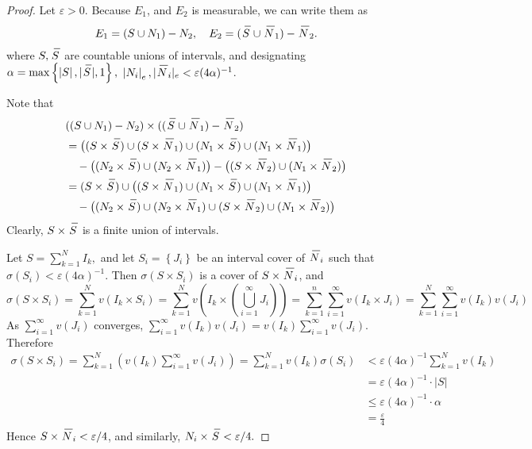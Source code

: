 \documentclass[12pt]{book}
\newcommand{\set}[1]{\left\{ #1 \right\}}
\renewcommand{\u}{\cup}
\newcommand{\bu}{\bigcup}
\newcommand{\inv}{^{-1}}
\newcommand{\cross}{\times}
\renewcommand{\.}{\mkern1mu}
\newcommand{\e}{\varepsilon}
\newcommand{\abs}[1]{\left| #1 \right|}
\newcommand{\lr}[1]{\left(#1\right)}
\newenvironment{pf}{\begin{proof}\setlength{\parindent}{\normalparindent}\setlength{\parskip}{\normalparskip}}{\end{proof}}
\theoremstyle{theorem}
\renewcommand{\bar}[1]{\overset{\hspace{3pt}\rule[0.5pt]{\widthof{#1}}  
	{0.1ex}}{#1}}
\newcommand{\mes}[1]{\abs{#1}}
\newcommand{\omes}[1]{\mes{#1}_e}
\newlength{\normalparindent}
\newlength{\normalparskip}
\begin{document}
	\begin{pf}
	Let $\e>0$. Because $E_1$, and $E_2$ is measurable, we can write them as
		\[ E_1 = (S \u N_1) - N_2, \quad E_2 = (\bar{S}\u \bar{N}_1) - \bar{N}_2.\]
	where $S,\bar{S}$ are countable unions of intervals, and designating $\alpha = \max\set{\mes{S}, |\bar{S}|, 1},$ $\omes{N_i},|\bar{N}_i|_e < \e(4\alpha)\inv$.
	
	Note that 
		\begin{align*}
		&((S\u N_1) - N_2) \cross ((\bar{S}\u \bar{N}_1) - \bar{N}_2)\\
		 &= \big((S\cross\bar{S}) \u (S\cross\bar{N}_1) \u (N_1\cross\bar{S}) \u (N_1\cross\bar{N}_1)\big)\\
			& \quad - \big((N_2\cross\bar{S})\u (N_2\cross\bar{N}_1)\big)  - \big((S\cross\bar{N}_2)\u (N_1\cross \bar{N}_2)\big)\\
			&= (S\cross \bar{S}) \u \big((S\cross\bar{N}_1)\u(N_1\cross\bar{S})\u (N_1\cross\bar{N}_1)\big)\\
			& \quad - \big((N_2\cross\bar{S})\u(N_2\cross\bar{N}_1)\u(S\cross\bar{N}_2)\u(N_1\cross\bar{N}_2)\big)
		\end{align*}
	Clearly, $S\cross\bar{S}$ is a finite union of intervals.
	
	Let $S = \sum_{k=1}^N I_k,$ and let $S_i = \set{J_i}$ be an interval cover of $\bar{N}_i$ such that ${\sigma(S_i) < \e(4\alpha)\inv}$. Then $\sigma(S\cross S_i)$ is a cover of $S\cross\bar{N}_i$, and 
		\[ \sigma(S\cross S_i) = \sum_{k=1}^N v(I_k\cross S_i) = \sum_{k=1}^N v\lr{I_k \cross\lr{\bu_{i=1}^\infty J_i}} = \sum_{k=1}^n \sum_{i=1}^\infty v(I_k \cross J_i) = \sum_{k=1}^N \sum_{i=1}^\infty v(I_k)v(J_i) \]
	As $\sum_{i=1}^\infty v(J_i)$ converges, $\sum_{i=1}^\infty v(I_k)v(J_i) = v(I_k)\sum_{i=1}^\infty v(J_i).$ Therefore
		\begin{align*} \sigma(S\cross S_i) 
			= \sum_{k=1}^N \lr{v(I_k)\sum_{i=1}^\infty v(J_i)} 
			= \sum_{k=1}^N v(I_k)\sigma(S_i) 
			& < \e(4\alpha)\inv \sum_{k=1}^N v(I_k) \\
				& = \e(4\alpha)\inv \cdot \mes{S} \\
				& \leq \e(4\alpha)\inv\cdot\alpha \\
				& = \frac{\e}{4}
		\end{align*}
	Hence $S \cross \bar{N}_i < \e/4$, and similarly, $N_i \cross \bar{S} < \e/4.$
	

\end{pf}
\end{document}
